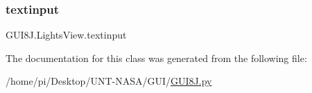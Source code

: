 \subsubsection{\texorpdfstring{textinput}{textinput}}
{\footnotesize\ttfamily G\+U\+I8\+J.\+Lights\+View.\+textinput}



The documentation for this class was generated from the following file\+:\begin{DoxyCompactItemize}
\item 
/home/pi/\+Desktop/\+U\+N\+T-\/\+N\+A\+S\+A/\+G\+U\+I/\hyperlink{GUI8J_8py}{G\+U\+I8\+J.\+py}\end{DoxyCompactItemize}
